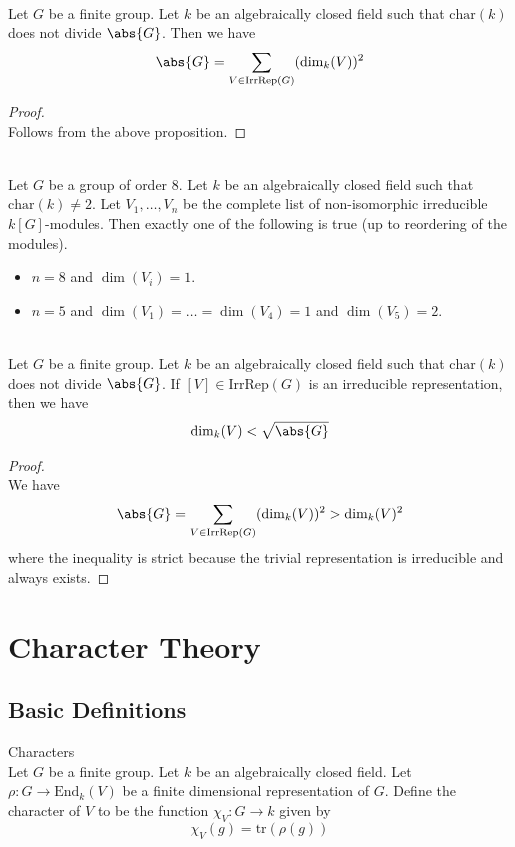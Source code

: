 \documentclass[a4paper]{article}
\begin{document}
\begin{crl}{}{}\\
Let $G$ be a finite group. Let $k$ be an algebraically closed field such that $\text{char}(k)$ does not divide $\abs{G}$. Then we have $$\abs{G}=\sum_{V\in\text{IrrRep}(G)}(\dim_k(V))^2$$
\begin{proof}\\
Follows from the above proposition. 
\end{proof}
\end{crl}

\begin{eg}{}{}\\
Let $G$ be a group of order $8$. Let $k$ be an algebraically closed field such that $\text{char}(k)\neq 2$. Let $V_1,\dots,V_n$ be the complete list of non-isomorphic irreducible $k[G]$-modules. Then exactly one of the following is true (up to reordering of the modules). 
\begin{itemize}
\item $n=8$ and $\dim(V_i)=1$. 
\item $n=5$ and $\dim(V_1)=\dots=\dim(V_4)=1$ and $\dim(V_5)=2$. 
\end{itemize}
\end{eg}

\begin{crl}{}{}\\
Let $G$ be a finite group. Let $k$ be an algebraically closed field such that $\text{char}(k)$ does not divide $\abs{G}$. If $[V]\in\text{IrrRep}(G)$ is an irreducible representation, then we have $$\dim_k(V)<\sqrt{\abs{G}}$$
\begin{proof}\\
We have $$\abs{G}=\sum_{V\in\text{IrrRep}(G)}(\dim_k(V))^2>\dim_k(V)^2$$ where the inequality is strict because the trivial representation is irreducible and always exists. 
\end{proof}
\end{crl}

\pagebreak
\section{Character Theory}
\subsection{Basic Definitions}
\begin{defn}{Characters}{}\\
Let $G$ be a finite group. Let $k$ be an algebraically closed field. Let $\rho:G\to\text{End}_k(V)$ be a finite dimensional representation of $G$. Define the character of $V$ to be the function $\chi_V:G\to k$ given by $$\chi_V(g)=\text{tr}(\rho(g))$$
\end{defn}
\end{document}
